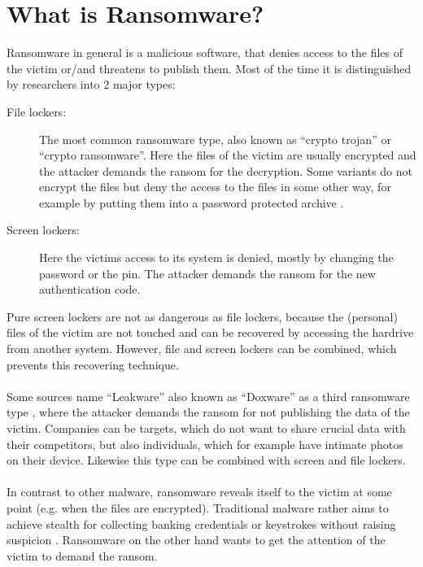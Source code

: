\section{What is Ransomware?}

Ransomware in general is a malicious software, that denies access to the files of the victim or/and threatens to publish them. Most of the time it is distinguished by researchers into 2 major types:

\begin{description}
\item[File lockers:] The most common ransomware type, also known as ``crypto trojan'' or ``crypto ransomware''. Here the files of the victim are usually encrypted and the attacker demands the ransom for the decryption. Some variants do not encrypt the files but deny the access to the files in some other way, for example by putting them into a password protected archive \cite{Symantec2017a}.
  
\item[Screen lockers:] Here the victims access to its system is denied, mostly by changing the password or the pin. The attacker demands the ransom for the new authentication code.
\end{description} 

Pure screen lockers are not as dangerous as file lockers, because the (personal) files of the victim are not touched and can be recovered by accessing the hardrive from another system. However, file and screen lockers can be combined, which prevents this recovering technique.\\
\\
Some sources name ``Leakware'' also known as ``Doxware'' as a third ransomware type \cite{Upadhaya2017}, where the attacker demands the ransom for not publishing the data of the victim. Companies can be targets, which do not want to share crucial data with their competitors, but also individuals, which for example have intimate photos on their device. Likewise this type can be combined with screen and file lockers.\\
\\
In contrast to other malware, ransomware reveals itself to the victim at some point (e.g. when the files are encrypted). Traditional malware rather aims to achieve stealth for collecting banking credentials or keystrokes without raising suspicion \cite{Kirda2017}. Ransomware on the other hand wants to get the attention of the victim to demand the ransom.
